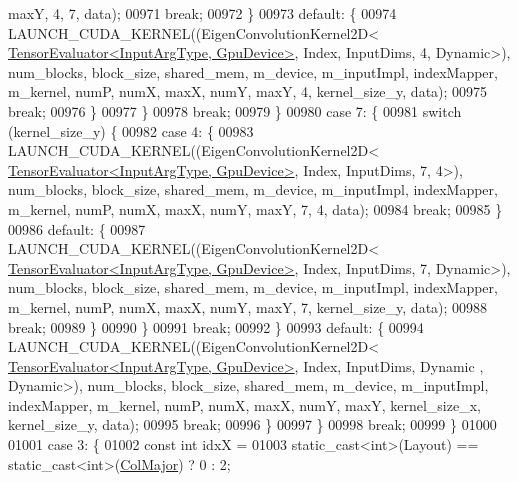 \begin{DoxyCode}
      maxY, 4, 7, data);
00971                 \textcolor{keywordflow}{break};
00972               \}
00973               \textcolor{keywordflow}{default}: \{
00974                 LAUNCH\_CUDA\_KERNEL((EigenConvolutionKernel2D<
      \hyperlink{struct_eigen_1_1_tensor_evaluator}{TensorEvaluator<InputArgType, GpuDevice>}, Index, InputDims, 4, 
      Dynamic>), num\_blocks, block\_size, shared\_mem, m\_device, m\_inputImpl, indexMapper, m\_kernel, numP, numX, maxX, 
      numY, maxY, 4, kernel\_size\_y, data);
00975                 \textcolor{keywordflow}{break};
00976               \}
00977             \}
00978             \textcolor{keywordflow}{break};
00979           \}
00980           \textcolor{keywordflow}{case} 7: \{
00981             \textcolor{keywordflow}{switch} (kernel\_size\_y) \{
00982               \textcolor{keywordflow}{case} 4: \{
00983                 LAUNCH\_CUDA\_KERNEL((EigenConvolutionKernel2D<
      \hyperlink{struct_eigen_1_1_tensor_evaluator}{TensorEvaluator<InputArgType, GpuDevice>}, Index, InputDims, 7, 4>),
       num\_blocks, block\_size, shared\_mem, m\_device, m\_inputImpl, indexMapper, m\_kernel, numP, numX, maxX, numY, 
      maxY, 7, 4, data);
00984                 \textcolor{keywordflow}{break};
00985               \}
00986               \textcolor{keywordflow}{default}: \{
00987                 LAUNCH\_CUDA\_KERNEL((EigenConvolutionKernel2D<
      \hyperlink{struct_eigen_1_1_tensor_evaluator}{TensorEvaluator<InputArgType, GpuDevice>}, Index, InputDims, 7, 
      Dynamic>), num\_blocks, block\_size, shared\_mem, m\_device, m\_inputImpl, indexMapper, m\_kernel, numP, numX, maxX, 
      numY, maxY, 7, kernel\_size\_y, data);
00988                 \textcolor{keywordflow}{break};
00989               \}
00990             \}
00991             \textcolor{keywordflow}{break};
00992           \}
00993           \textcolor{keywordflow}{default}: \{
00994             LAUNCH\_CUDA\_KERNEL((EigenConvolutionKernel2D<
      \hyperlink{struct_eigen_1_1_tensor_evaluator}{TensorEvaluator<InputArgType, GpuDevice>}, Index, InputDims, Dynamic
      , Dynamic>), num\_blocks, block\_size, shared\_mem, m\_device, m\_inputImpl, indexMapper, m\_kernel, numP, numX, 
      maxX, numY, maxY, kernel\_size\_x, kernel\_size\_y, data);
00995             \textcolor{keywordflow}{break};
00996           \}
00997         \}
00998         \textcolor{keywordflow}{break};
00999       \}
01000 
01001       \textcolor{keywordflow}{case} 3: \{
01002         \textcolor{keyword}{const} \textcolor{keywordtype}{int} idxX =
01003             \textcolor{keyword}{static\_cast<}\textcolor{keywordtype}{int}\textcolor{keyword}{>}(Layout) == static\_cast<int>(\hyperlink{group__enums_ggaacded1a18ae58b0f554751f6cdf9eb13a0cbd4bdd0abcfc0224c5fcb5e4f6669a}{ColMajor}) ? 0 : 2;

\end{DoxyCode}
